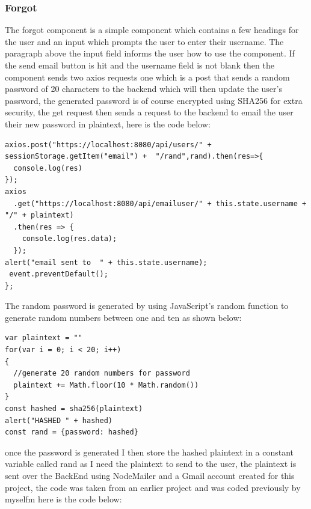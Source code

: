 \subsubsection{Forgot}
The forgot component is a simple component which contains a few headings for the user and an input which prompts the user to enter their username.  The paragraph above the input field informs the user how to use the component.  If the send email button is hit and the username field is not blank then the component sends two axios requests one which is a post that sends a random password of 20 characters to the backend which will then update the user's password, the generated password is of course encrypted using SHA256 for extra security, the get request then sends a request to the backend to email the user their new password in plaintext, here is the code below:
\begin{verbatim}
axios.post("https://localhost:8080/api/users/" + sessionStorage.getItem("email") +  "/rand",rand).then(res=>{
  console.log(res)
});
axios
  .get("https://localhost:8080/api/emailuser/" + this.state.username + "/" + plaintext)
  .then(res => {
    console.log(res.data);
  });
alert("email sent to  " + this.state.username);
 event.preventDefault();
};
\end{verbatim}
The random password is generated by using JavaScript's random function to generate random numbers between one and ten as shown below:
\begin{verbatim}
var plaintext = ""
for(var i = 0; i < 20; i++)
{
  //generate 20 random numbers for password
  plaintext += Math.floor(10 * Math.random())
}
const hashed = sha256(plaintext)
alert("HASHED " + hashed)
const rand = {password: hashed}
\end{verbatim}
once the password is generated I then store the hashed plaintext in a constant variable called rand as I need the plaintext to send to the user, the plaintext is sent over the BackEnd using NodeMailer and a Gmail account created for this project, the code was taken from an earlier project and was coded previously by myselfm here is the code below:
